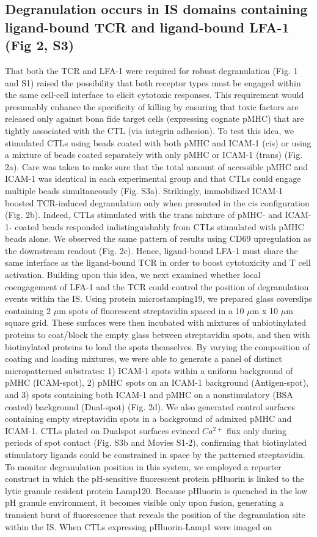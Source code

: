 \subsection{Degranulation occurs in IS domains containing ligand-bound TCR and ligand-bound LFA-1 (Fig 2, S3)}
That both the TCR and LFA-1 were required for robust degranulation (Fig. 1 and S1) raised the possibility that both receptor types must be engaged within the same cell-cell interface to elicit cytotoxic responses. This requirement would presumably enhance the specificity of killing by ensuring that toxic factors are released only against bona fide target cells (expressing cognate pMHC) that are tightly associated with the CTL (via integrin adhesion). To test this idea, we stimulated CTLs using beads coated with both pMHC and ICAM-1 (cis) or using a mixture of beads coated separately with only pMHC or ICAM-1 (trans) (Fig. 2a). Care was taken to make sure that the total amount of accessible pMHC and ICAM-1 was identical in each experimental group and that CTLs could engage multiple beads simultaneously (Fig. S3a). Strikingly, immobilized ICAM-1 boosted TCR-induced degranulation only when presented in the cis configuration (Fig. 2b). Indeed, CTLs stimulated with the trans mixture of pMHC- and ICAM-1- coated beads responded indistinguishably from CTLs stimulated with pMHC beads alone. We observed the same pattern of results using CD69 upregulation as the downstream readout (Fig. 2c). Hence, ligand-bound LFA-1 must share the same interface as the ligand-bound TCR in order to boost cytotoxicity and T cell activation. Building upon this idea, we next examined whether local coengagement of LFA-1 and the TCR could control the position of degranulation events within the IS. Using protein microstamping19, we prepared glass coverslips containing 2 $\mu$m spots of fluorescent streptavidin spaced in a 10 $\mu$m x 10 $\mu$m square grid. These surfaces were then incubated with mixtures of unbiotinylated proteins to coat/block the empty glass between streptavidin spots, and then with biotinylated proteins to load the spots themselves. By varying the composition of coating and loading mixtures, we were able to generate a panel of distinct micropatterned substrates: 1) ICAM-1 spots within a uniform background of pMHC (ICAM-spot), 2) pMHC spots on an ICAM-1 background (Antigen-spot), and 3) spots containing both ICAM-1 and pMHC on a nonstimulatory (BSA coated) background (Dual-spot) (Fig. 2d). We also generated control surfaces containing empty streptavidin spots in a background of admixed pMHC and ICAM-1. CTLs plated on Dualspot surfaces evinced $Ca^{2+}$ flux only during periods of spot contact (Fig. S3b and Movies S1-2), confirming that biotinylated stimulatory ligands could be constrained in space by the patterned streptavidin. To monitor degranulation position in this system, we employed a reporter construct in which the pH-sensitive fluorescent protein pHluorin is linked to the lytic granule resident protein Lamp120. Because pHluorin is quenched in the low pH granule environment, it becomes visible only upon fusion, generating a transient burst of fluorescence that reveals the position of the degranulation site within the IS. When CTLs expressing pHluorin-Lamp1 were imaged on 